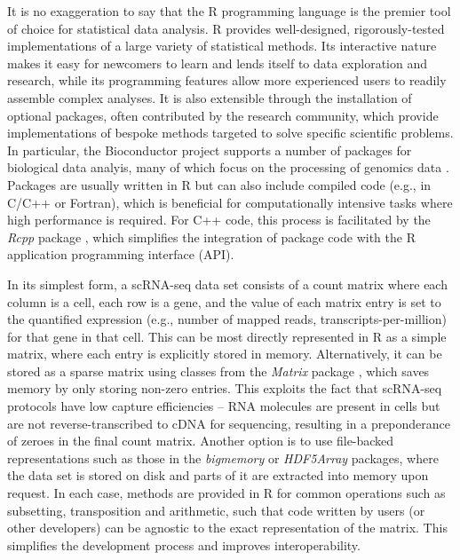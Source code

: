 \documentclass[10pt,letterpaper]{article}
\begin{document}
It is no exaggeration to say that the R programming language \cite{R} is the premier tool of choice for statistical data analysis.
R provides well-designed, rigorously-tested implementations of a large variety of statistical methods.
Its interactive nature makes it easy for newcomers to learn and lends itself to data exploration and research, while its programming features allow more experienced users to readily assemble complex analyses.
It is also extensible through the installation of optional packages, often contributed by the research community, which provide implementations of bespoke methods targeted to solve specific scientific problems.
In particular, the Bioconductor project \cite{gentleman2004bioconductor} supports a number of packages for biological data analyis, many of which focus on the processing of genomics data \cite{huber2015orchestrating}.
Packages are usually written in R but can also include compiled code (e.g., in C/C++ or Fortran), which is beneficial for computationally intensive tasks where high performance is required.
For C++ code, this process is facilitated by the \textit{Rcpp} package \cite{eddelbuettel2011seamless}, which simplifies the integration of package code with the R application programming interface (API).

In its simplest form, a scRNA-seq data set consists of a count matrix where each column is a cell, each row is a gene, and the value of each matrix entry is set to the quantified expression (e.g., number of mapped reads, transcripts-per-million) for that gene in that cell.
This can be most directly represented in R as a simple matrix, where each entry is explicitly stored in memory.
Alternatively, it can be stored as a sparse matrix using classes from the \textit{Matrix} package \cite{bates2017matrix}, which saves memory by only storing non-zero entries.
This exploits the fact that scRNA-seq protocols have low capture efficiencies \cite{grun2015design} -- RNA molecules are present in cells but are not reverse-transcribed to cDNA for sequencing, resulting in a preponderance of zeroes in the final count matrix.
Another option is to use file-backed representations such as those in the \textit{bigmemory} \cite{kane2013scalable} or \textit{HDF5Array} packages, where the data set is stored on disk and parts of it are extracted into memory upon request.
In each case, methods are provided in R for common operations such as subsetting, transposition and arithmetic, such that code written by users (or other developers) can be agnostic to the exact representation of the matrix.
This simplifies the development process and improves interoperability.
\end{document}
